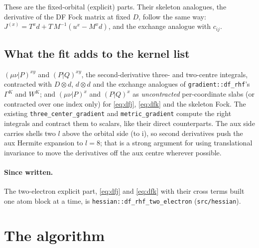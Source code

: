 \documentclass[11pt]{article}
\newcommand{\code}[1]{\texttt{#1}}
\begin{document}
These are the fixed-orbital (explicit) parts. Their skeleton analogues,
the derivative of the DF Fock matrix at fixed $D$, follow the same way:
$J^{(x)} = T^x d + T\,M^{-1}(u^x - M^x d)$, and the exchange analogue
with $c_{ij}$.

\subsection{What the fit adds to the kernel list}

$(\mu\nu|P)^{xy}$ and $(P|Q)^{xy}$, the second-derivative three- and
two-centre integrals, contracted with $D\otimes d$, $d\otimes d$ and the
exchange analogues of \code{gradient::df\_rhf}'s $\Gamma^K$ and $W^K$;
and $(\mu\nu|P)^x$ and $(P|Q)^x$ as \emph{uncontracted} per-coordinate
slabs (or contracted over one index only) for \eqref{eq:dfj},
\eqref{eq:dfk} and the skeleton Fock. The existing
\code{three\_center\_gradient} and \code{metric\_gradient} compute the
right integrals and contract them to scalars, like their direct
counterparts. The aux side carries shells two $l$ above the orbital side
(to i), so second derivatives push the aux Hermite expansion to $l = 8$;
that is a strong argument for using translational invariance to move the
derivatives off the aux centre wherever possible.

\paragraph{Since written.} The two-electron explicit part, \eqref{eq:dfj}
and \eqref{eq:dfk} with their cross terms built one atom block at a time,
is \code{hessian::df\_rhf\_two\_electron} (\code{src/hessian}).

\section{The algorithm}
\label{sec:rhf-algorithm}
\end{document}
